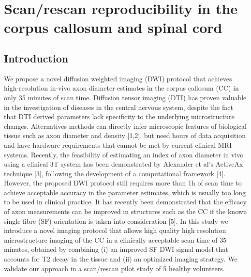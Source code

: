 \newsavebox{\poorBox}
\savebox{\poorBox}{\textcolor{red}{\rule{0.05in}{0.05in}}}
\newsavebox{\fairBox}
\savebox{\fairBox}{\textcolor{orange}{\rule{0.05in}{0.05in}}}
\newsavebox{\moderateBox}
\savebox{\moderateBox}{\textcolor{yellow}{\rule{0.05in}{0.05in}}}
\newsavebox{\substantialBox}
\savebox{\substantialBox}{\textcolor{lime}{\rule{0.05in}{0.05in}}}
\newsavebox{\perfectBox}
\savebox{\perfectBox}{\textcolor{green}{\rule{0.05in}{0.05in}}}


\chapter[Scan/rescan in the corpus callosum]{Scan/rescan reproducibility in the corpus callosum and spinal cord}
\section{Introduction}
We propose a novel diffusion weighted imaging (DWI) protocol that achieves high-resolution in-vivo axon diameter estimates in the corpus callosum (CC) in only 35 minutes of scan time. Diffusion tensor imaging (DTI) has proven valuable in the investigation of diseases in the central nervous system, despite the fact that DTI derived parameters lack specificity to the underlying microstructure changes. Alternatives methods can directly infer microscopic features of biological tissue such as axon diameter and density [1,2], but need hours of data acquisition and have hardware requirements that cannot be met by current clinical MRI systems.  Recently, the feasibility of estimating an index of axon diameter in vivo using a clinical 3T system has been demonstrated by Alexander et al’s ActiveAx technique [3], following the development of a computational framework [4]. However, the proposed DWI protocol still requires more than 1h of scan time to achieve acceptable accuracy in the parameter estimates, which is usually too long to be used in clinical practice. It has recently been demonstrated that the efficacy of axon measurements can be improved in structures such as the CC if the known single fibre (SF) orientation is taken into consideration [5]. In this study we introduce a novel imaging protocol that allows high quality high resolution microstructure imaging of the CC in a clinically acceptable scan time of 35 minutes, obtained by combining (i) an improved SF DWI signal model that accounts for T2 decay in the tissue and (ii) an optimized imaging strategy. We validate our approach in a scan/rescan pilot study of 5 healthy volunteers. 
